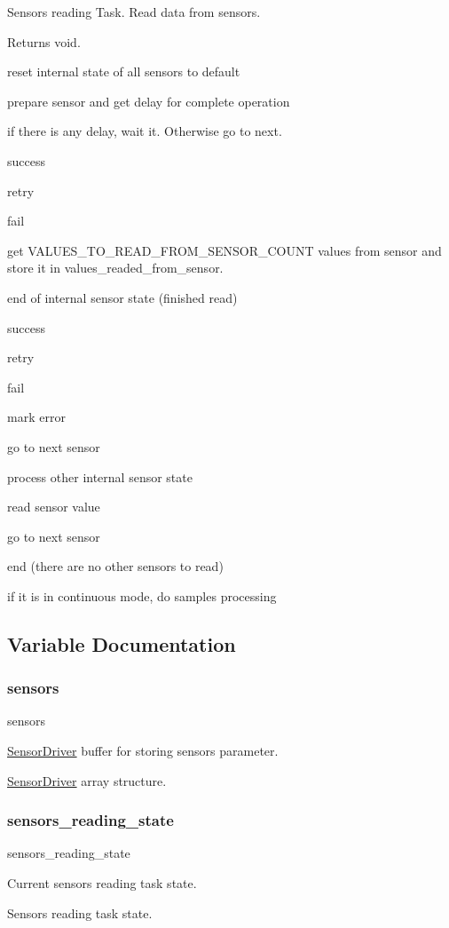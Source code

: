 Sensors reading Task. Read data from sensors. 

\begin{DoxyReturn}{Returns}
void. 
\end{DoxyReturn}
reset internal state of all sensors to default

prepare sensor and get delay for complete operation

if there is any delay, wait it. Otherwise go to next.

success

retry

fail

get V\+A\+L\+U\+E\+S\+\_\+\+T\+O\+\_\+\+R\+E\+A\+D\+\_\+\+F\+R\+O\+M\+\_\+\+S\+E\+N\+S\+O\+R\+\_\+\+C\+O\+U\+NT values from sensor and store it in values\+\_\+readed\+\_\+from\+\_\+sensor.

end of internal sensor state (finished read)

success

retry

fail

mark error

go to next sensor

process other internal sensor state

read sensor value

go to next sensor

end (there are no other sensors to read)

if it is in continuous mode, do samples processing 

\subsection{Variable Documentation}
\mbox{\label{i2c-th_8h_ac07b59f913caef2eaea4e4bb93c901e9}} 
\subsubsection{\texorpdfstring{sensors}{sensors}}
{\footnotesize\ttfamily sensors}



\hyperlink{classSensorDriver}{Sensor\+Driver} buffer for storing sensors parameter. 

\hyperlink{classSensorDriver}{Sensor\+Driver} array structure. \mbox{\label{i2c-th_8h_a2ad2494d7aa3d5924b49127e1acefe40}} 
\subsubsection{\texorpdfstring{sensors\+\_\+reading\+\_\+state}{sensors\_reading\_state}}
{\footnotesize\ttfamily sensors\+\_\+reading\+\_\+state}



Current sensors reading task state. 

Sensors reading task state. 